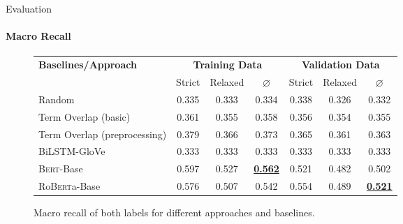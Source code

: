 \documentclass[english,handout]{mlutalk}
\newcommand{\BiLSTM}{\mbox{BiLSTM}\xspace}
\newcommand{\Bert}{\textsc{Bert}\xspace}
\newcommand{\BertBase}{\Bert-Base\xspace}
\newcommand{\Roberta}{\mbox{Ro\textsc{Bert}a}\xspace}
\newcommand{\RobertaBase}{\Roberta-Base\xspace}
\renewcommand{\lg}{\color{lightgray}}
\begin{document}
\begin{frame}{Evaluation}
  \framesubtitle{Macro Recall}
  \begin{figure}
    \centering
    \caption{Macro recall of both labels for different approaches and baselines.}
    \scriptsize
    \begin{tabular}{lcccccc}
      \toprule
      \textbf{Baselines/Approach} & \multicolumn{3}{c}{\textbf{Training Data}} & \multicolumn{3}{c}{\textbf{Validation Data}} \\
      \cmidrule(r{0.5em}){2-4} \cmidrule(l{0.5em}){5-7}
      & Strict & Relaxed & \(\varnothing\) & Strict & Relaxed & \(\varnothing\) \\
      \midrule
      Random 
      & 0.335 & 0.333 & 0.334 & 0.338 & 0.326 & 0.332 \\
      Term Overlap (basic)
      & 0.361 & 0.355 & 0.358 & 0.356 & 0.354 & 0.355 \\
      Term Overlap (preprocessing)
      & 0.379 & 0.366 & 0.373 & 0.365 & 0.361 & 0.363 \\
      \midrule
      \lg\BiLSTM-GloVe
      & \lg0.333 & \lg0.333 & \lg0.333 & \lg0.333 & \lg0.333 & \lg0.333 \\
      \BertBase
      & 0.597 & 0.527 & \textbf{\underline{0.562}} & 0.521 & 0.482 & 0.502 \\
      \RobertaBase
      & 0.576 & 0.507 & 0.542 & 0.554 & 0.489 & \textbf{\underline{0.521}} \\
      \bottomrule
    \end{tabular}
  \end{figure}
\end{frame}
\end{document}
